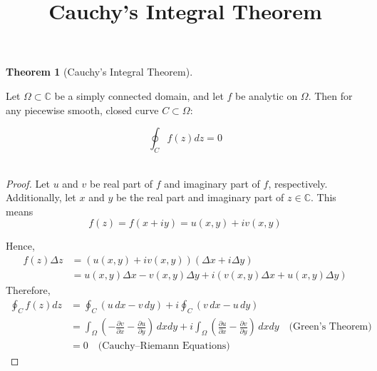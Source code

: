 \documentclass[letterpaper, 12pt]{article}
\title{Cauchy's Integral Theorem}
\date{}
\theoremstyle{custom}
\newtheorem*{theorem}{Theorem}
\begin{document}
\maketitle

\begin{theorem}[Cauchy's Integral Theorem]
\end{theorem}
Let $\Omega \subset \mathbb{C}$ be a simply connected domain, and let $f$ be analytic on $\Omega$. Then for any piecewise smooth, closed curve $C \subset \Omega$:

\begin{equation*}
  \oint_C f(z) dz = 0
\end{equation*}\\
\begin{proof}
  Let $u$ and $v$ be real part of $f$ and imaginary part of $f$, respectively.
  Additionally, let $x$ and $y$ be the real part and imaginary part of $z \in \mathbb{C} $.
  This means
  \begin{equation*}
    f(z) = f(x + iy) = u(x, y) + iv(x, y)
  \end{equation*}

  Hence, 
  \begin{align*}
    f(z) \Delta z &= \left( u(x, y) + iv(x, y) \right) \left( \Delta x + i\Delta y \right) \\
                  &= u(x, y) \Delta x - v(x, y)\Delta y +  i \left( v(x, y) \Delta x + u(x, y) \Delta y \right)
  \end{align*}
  Therefore,
  \begin{align*}
    \oint_C f(z) dz &= \oint_C \left( u \, dx - v \, dy \right)  + i  \oint_C \left( v \, dx - u \, dy \right)\\
    &= \int_\Omega \left( -\frac{\partial v}{\partial x} - \frac{\partial u}{\partial y} \right) \, dxdy + i \int_\Omega \left( \frac{\partial u}{\partial x} - \frac{\partial v}{\partial y} \right) \, dxdy \quad \text{(Green's Theorem)}\\
    &= 0 \quad \text{(Cauchy--Riemann Equations)}
  \end{align*}
\end{proof}
\end{document}
